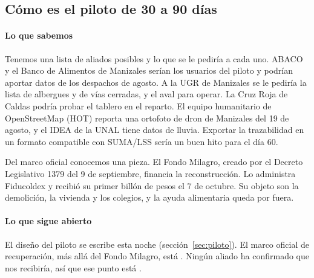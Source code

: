\subsection{Cómo es el piloto de 30 a 90 días}

\paragraph{Lo que sabemos} Tenemos una lista de aliados posibles y lo que se le pediría a cada uno. ABACO y el Banco de Alimentos de Manizales serían los usuarios del piloto y podrían aportar datos de los despachos de agosto. A la UGR de Manizales se le pediría la lista de albergues y de vías cerradas, y el aval para operar. La Cruz Roja de Caldas podría probar el tablero en el reparto. El equipo humanitario de OpenStreetMap (HOT) reporta una ortofoto de dron de Manizales del 19 de agosto, y el IDEA de la UNAL tiene datos de lluvia. Exportar la trazabilidad en un formato compatible con SUMA/LSS sería un buen hito para el día 60.

Del marco oficial conocemos una pieza. El Fondo Milagro, creado por el Decreto Legislativo 1379 del 9 de septiembre, financia la reconstrucción. Lo administra Fiducoldex y recibió su primer billón de pesos el 7 de octubre. Su objeto son la demolición, la vivienda y los colegios, y la ayuda alimentaria queda por fuera.

\paragraph{Lo que sigue abierto} El diseño del piloto se escribe esta noche (sección~\ref{sec:piloto}). El marco oficial de recuperación, más allá del Fondo Milagro, está \eninvestigacion. Ningún aliado ha confirmado que nos recibiría, así que ese punto está \pendiente.
